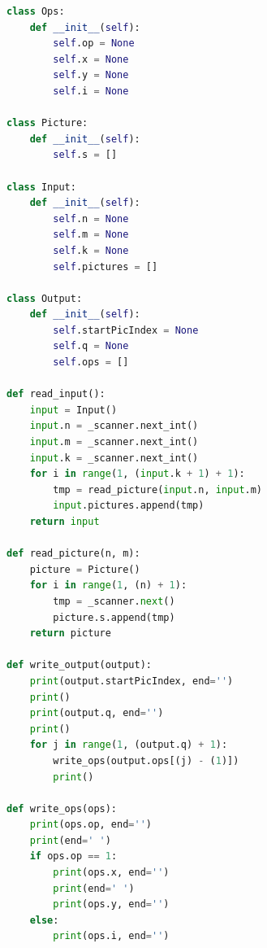 \documentclass[times,specification,annotation]{style/itmo-student-thesis/itmo-student-thesis}
\begin{document}
\begin{lstlisting}[caption={Часть сгенерированного кода грейдера на языке Java},label={gen-grader-python},language=Python]
class Ops:
    def __init__(self):
        self.op = None
        self.x = None
        self.y = None
        self.i = None

class Picture:
    def __init__(self):
        self.s = []

class Input:
    def __init__(self):
        self.n = None
        self.m = None
        self.k = None
        self.pictures = []

class Output:
    def __init__(self):
        self.startPicIndex = None
        self.q = None
        self.ops = []

def read_input():
    input = Input()
    input.n = _scanner.next_int()
    input.m = _scanner.next_int()
    input.k = _scanner.next_int()
    for i in range(1, (input.k + 1) + 1):
        tmp = read_picture(input.n, input.m)
        input.pictures.append(tmp)
    return input

def read_picture(n, m):
    picture = Picture()
    for i in range(1, (n) + 1):
        tmp = _scanner.next()
        picture.s.append(tmp)
    return picture

def write_output(output):
    print(output.startPicIndex, end='')
    print()
    print(output.q, end='')
    print()
    for j in range(1, (output.q) + 1):
        write_ops(output.ops[(j) - (1)])
        print()

def write_ops(ops):
    print(ops.op, end='')
    print(end=' ')
    if ops.op == 1:
        print(ops.x, end='')
        print(end=' ')
        print(ops.y, end='')
    else:
        print(ops.i, end='')
\end{lstlisting}
\end{document}
